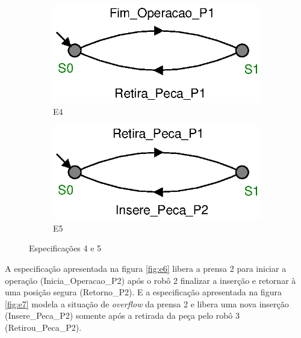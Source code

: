 \begin{figure}[H]%
  \centering
  \begin{subfigure}[b]{0.45\textwidth}
      \centering
      \includegraphics[width=\textwidth]{imagens/E4.eps}
      \caption{E4}
      \label{fig:e4}
  \end{subfigure}
  \hfill
  \begin{subfigure}[b]{0.45\textwidth}
      \centering
      \includegraphics[width=\textwidth]{imagens/E5.eps}
      \caption{E5}
      \label{fig:e5}
  \end{subfigure}
  \caption{Especificações 4 e 5}
  \label{fig:e45}
\end{figure}

A especificação apresentada na figura \ref{fig:e6} libera a prensa 2 para iniciar a operação (Inicia\_Operacao\_P2) após o robô 2 finalizar a inserção e retornar à uma posição segura (Retorno\_P2). E a especificação apresentada na figura \ref{fig:e7} modela a situação de \textit{overflow} da prensa 2 e libera uma nova inserção (Insere\_Peca\_P2) somente após a retirada da peça pelo robô 3 (Retirou\_Peca\_P2).

